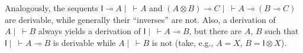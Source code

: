\documentclass[copyright,creativecommons]{eptcs}
\theoremstyle{definition}
\newcommand{\tl}{\otimes \mathsf{L}}
\newcommand{\ot}{\otimes}
\newcommand{\lolli}{\multimap}
\newcommand{\I}{\mathsf{I}}
\begin{document}
Analogously, the sequents $\I \lolli A \mid ~ \vdash A$ and $(A \ot B) \lolli C \mid ~ \vdash A \lolli (B \lolli C)$ are derivable, while generally their ``inverses'' are not. Also, a derivation of $A \mid ~ \vdash B$ always yields a derivation of $\I \mid ~ \vdash A \lolli B$, but there are $A$, $B$ such that $\I \mid ~ \vdash A \lolli B$ is derivable while  $A \mid ~ \vdash B$ is not (take, e.g., $A = X$, $B = \I \ot X$).
\end{document}
